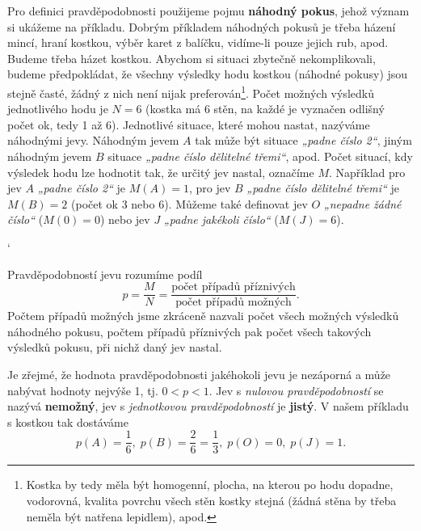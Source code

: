      Pro definici pravděpodobnosti použijeme pojmu \textbf{náhodný pokus}, jehož význam si ukážeme 
      na příkladu. Dobrým příkladem náhodných pokusů je třeba házení mincí, hraní kostkou, výběr 
      karet z balíčku, vidíme-li pouze jejich rub, apod. Budeme třeba házet kostkou. Abychom si 
      situaci zbytečně nekomplikovali, budeme předpokládat, že všechny výsledky hodu kostkou 
      (náhodné pokusy) jsou stejně časté, žádný z nich není nijak preferován\footnote{Kostka by 
      tedy měla být homogenní, plocha, na kterou po hodu dopadne, vodorovná, kvalita povrchu všech 
      stěn kostky stejná (žádná stěna by třeba neměla být natřena lepidlem), apod.}. Počet možných 
      výsledků jednotlivého hodu je \(N = 6\) (kostka má \num{6} stěn, na každé je vyznačen odlišný 
      počet ok, tedy \num{1} až \num{6}). Jednotlivé situace, které mohou nastat, nazýváme 
      náhodnými jevy. Náhodným jevem \(A\) tak může být situace \emph{„padne číslo \num{2}“}, jiným 
      náhodným jevem \(B\) situace \emph{„padne číslo dělitelné třemi“}, apod. Počet situací, kdy 
      výsledek hodu lze hodnotit tak, že určitý jev nastal, označíme \(M\). Například pro jev \(A\) 
      \emph{„padne číslo \num{2}“} je \(M(A)= 1\), pro jev \(B\) \emph{„padne číslo dělitelné 
      třemi“} je \(M(B) = 2\) (počet ok \num{3} nebo \num{6}). Můžeme také definovat jev \(O\) 
      \emph{„nepadne žádné číslo“} (\(M(0) = 0\)) nebo jev \(J\) \emph{„padne jakékoli číslo“} 
      (\(M(J) = 6\)).      
      \begin{mdframed}[style=mdmathdef]
    `   \begin{definition}
          Pravděpodobností jevu rozumíme podíl
          \begin{equation}\label{mai:eq011}
            p = \frac{M}{N} = \frac{\text{počet případů příznivých}}{\text{počet případů možných}}.
          \end{equation}  
          Počtem případů možných jsme zkráceně nazvali počet všech možných výsledků náhodného 
          pokusu, počtem případů příznivých pak počet všech takových výsledků pokusu, při nichž daný 
          jev nastal.
        \end{definition}
      \end{mdframed}

      Je zřejmé, že hodnota pravděpodobnosti jakéhokoli jevu je nezáporná a může nabývat hodnoty 
      nejvýše \num{1}, tj. \(0 <p< 1\). Jev s \emph{nulovou pravděpodobností} se nazývá 
      \textbf{nemožný}, jev s \emph{jednotkovou pravděpodobností} je \textbf{jistý}. V našem 
      příkladu s kostkou tak dostáváme
      \begin{equation*}
        p(A) = \frac{1}{6}, \; p(B) = \frac{2}{6} = \frac{1}{3}, \; p(O) = 0, \; p(J) = 1.
      \end{equation*}  

